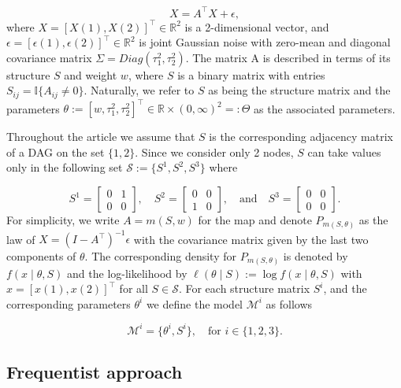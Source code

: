 \documentclass[accepted]{uai2026} %
\def\transpose{\intercal}
\theoremstyle{boldremark}
\begin{document}
\begin{equation}
    X = A^\transpose X + \epsilon,
    \label{eq:SCM_vector}
\end{equation}
where $X = [X(1), X(2)]^\transpose \in \mathbb{R}^2$ is a 2-dimensional vector, and $\epsilon = [\epsilon(1), \epsilon(2)]^\transpose \in \mathbb{R}^2$ is joint Gaussian noise with zero-mean and diagonal covariance matrix $\Sigma = Diag(\tau_1^2, \tau_2^2)$. The matrix A is described in terms of its structure $S$ and weight $w$, where $S$ is a binary matrix with entries $S_{ij} = \mathbb{I}\{A_{ij} \neq 0\}$. Naturally, we refer to $S$ as being the structure matrix and the parameters $\theta := [w, \tau_1^2, \tau_2^2]^\transpose \in \mathbb{R} \times (0, \infty)^2=:\Theta$ as the associated parameters. 

Throughout the article we assume that $S$ is the corresponding adjacency matrix of a 
DAG on the set $\{1, 2\}$. Since we consider only 2 nodes, $S$ can take values only in the following set $\mathcal{S} := \{S^1, S^2, S^3\}$ where

$$S^1 = \begin{bmatrix}
    0 & 1\\
    0 & 0
\end{bmatrix}, \quad S^2 = \begin{bmatrix}
    0&0\\
    1&0
\end{bmatrix}, \quad \text{and}\quad S^3 = \begin{bmatrix}
    0&0\\
    0&0
\end{bmatrix}.$$
For simplicity, we write $A = m(S, w)$ for the map and denote $P_{m(S, \theta)}$ as the law of $X = (I-A^\transpose)^{-1}\epsilon$ with the covariance matrix given by the last two components of $\theta$. The corresponding density for $P_{m(S, \theta)}$ is denoted by $f(x\mid \theta, S)$ and the log-likelihood by $\ell(\theta\mid S) := \log f(x\mid \theta, S)$ with $x = [x(1), x(2)]^\transpose$ for all $S \in \mathcal{S}$. For each structure matrix $S^i$, and the corresponding parameters $\theta^i$ we define the model $\mathcal{M}^i$ as follows

$$\mathcal{M}^i = \{\theta^i, S^i\},\quad \text{for } i \in \{1,2,3\}.$$


\subsection{Frequentist approach}
\end{document}
